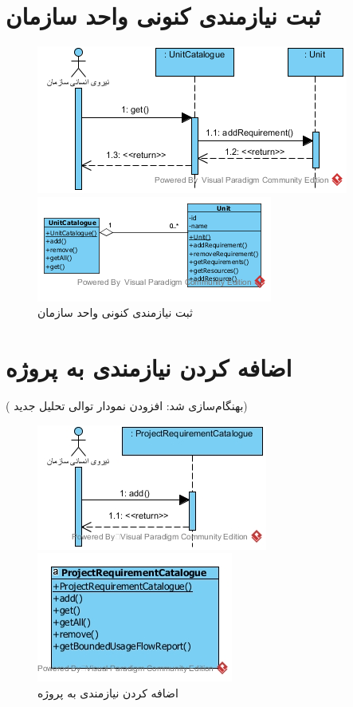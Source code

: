 \section{ثبت نیازمندی کنونی واحد سازمان}
\begin{figure}[H]
	\centering
	\includegraphics[scale=1]{img/sequence-analysis/AddRequirementToUnit}
	
	
	\includegraphics[scale=1]{img/sequence-analysis/AddRequirementToUnitC}
	\caption{ثبت نیازمندی کنونی واحد سازمان}
\end{figure}
\newpage
\section{اضافه کردن نیازمندی به پروژه}
({\color{red} بهنگام‌سازی شد: افزودن نمودار توالی تحلیل جدید})
\begin{figure}[H]
	\centering
	\includegraphics[scale=1]{img/sequence-analysis/AddRequirementToProject}
	
	
	\includegraphics[scale=0.8]{img/sequence-analysis/AddRequirementToProjectC}
	\caption{اضافه کردن نیازمندی به پروژه}
\end{figure}

